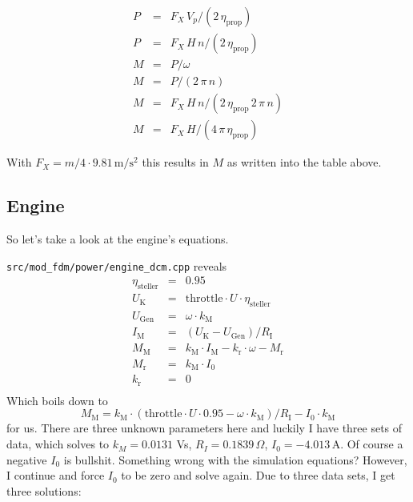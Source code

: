 \documentclass[a4paper, 11pt, pdftex]{article}
\newcommand{\unit}[1]{\textrm{#1}}
\newcommand{\vi}[1]{_{\textrm{#1}}}
\newcommand{\EtaProp}{\eta_{\textrm{prop}}}
\newcommand{\EtaSteller}{\eta_{\textrm{steller}}}
\begin{document}
    \begin{subequations}
    \begin{eqnarray}  
      P &=& F_X \, V_p / (2 \, \EtaProp) \\
      P &=& F_X \, H \, n / (2 \, \EtaProp) \\
      M &=& P / \omega \\
      M &=& P / (2 \, \pi \, n) \\
      M &=& F_X \, H \, n / (2 \, \EtaProp \, 2 \, \pi \, n)\\
      M &=& F_X \, H / (4 \, \pi \, \EtaProp)
    \end{eqnarray}
    \end{subequations}
      
    With $F_X = m/4 \cdot 9.81\,\unit{m}/\unit{s}^2$ this results in $M$ as
    written into the table above.
    
    \subsection{Engine}
    
    So let's take a look at the engine's equations.
    
    {\tt src/mod\_fdm/power/engine\_dcm.cpp} reveals
    \begin{subequations}
    \begin{eqnarray}  \label{f:MOTOR}
      \EtaSteller &=& 0.95 \\
      U\vi{K} &=& \textrm{throttle} \cdot U \cdot \EtaSteller \\
      U\vi{Gen} &=& \omega \cdot k\vi{M} \\
      I\vi{M} &=& (U\vi{K} - U\vi{Gen}) / R\vi{I} \\
      M\vi{M} &=& k\vi{M} \cdot I\vi{M} - k\vi{r} \cdot \omega - M\vi{r} \\
      M\vi{r} &=& k\vi{M} \cdot I_0 \\
      k\vi{r} &=& 0 \\
    \end{eqnarray}
    \end{subequations}
    Which boils down to
    \begin{equation}
      M\vi{M} = k\vi{M} \cdot (\textrm{throttle} \cdot U \cdot 0.95 - \omega \cdot k\vi{M}) / R\vi{I} - I_0 \cdot k\vi{M}
    \end{equation}
    for us. There are three unknown parameters here and luckily I have three sets of data, 
    which solves to $k_M=0.0131$ Vs, $R_I=0.1839\,\Omega$, $I_0=-4.013$\,A. Of course a negative 
    $I_0$ is bullshit. Something wrong with the simulation equations? However, 
    I continue and force $I_0$ to be zero and solve again. Due to three data sets, I get 
    three solutions:
    
\end{document}
